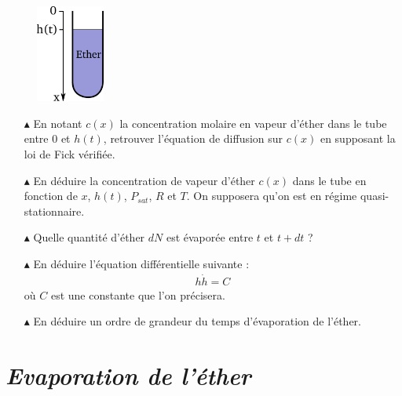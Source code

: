 \documentclass{report}
\begin{document}
\begin{figure}[h!]
\centering
  \includegraphics[width=0.2\textwidth]{ether2.pdf}
\end{figure}

\begin{itemize}

	\item[$\blacktriangle$] En notant $c(x)$ la concentration molaire en vapeur d'éther dans le tube entre $0$ et $h(t)$, retrouver l'équation de diffusion sur $c(x)$ en supposant la loi de Fick vérifiée.
	
	\item[$\blacktriangle$] En déduire la concentration de vapeur d'éther $c(x)$ dans le tube en fonction de $x$, $h(t)$, $P_{sat}$, $R$ et $T$. On supposera qu'on est en régime quasi-stationnaire.
	
	\item[$\blacktriangle$] Quelle quantité d'éther $dN$ est évaporée entre $t$ et $t+dt$ ? 
	
	\item[$\blacktriangle$] En déduire l'équation différentielle suivante :
	\begin{align*}
		h\dot{h}=C		
	\end{align*}
	où $C$ est une constante que l'on précisera.
	
	\item[$\blacktriangle$] En déduire un ordre de grandeur du temps d'évaporation de l'éther.

\end{itemize}

\newpage

\section*{\textit{Evaporation de l'éther}}
\end{document}

